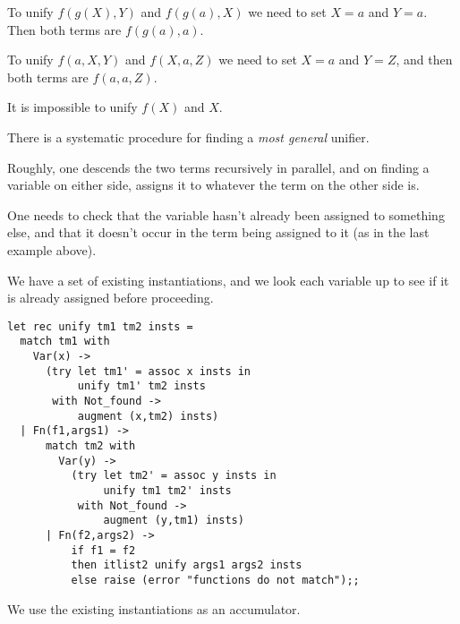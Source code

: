 \begin{slide*}


\vspace*{0.5cm}

To unify {\red $f(g(X),Y)$} and {\red $f(g(a),X)$} we need to set {\red $X =
a$} and {\red $Y = a$}. Then both terms are {\red $f(g(a),a)$}.

To unify {\red $f(a,X,Y)$} and {\red $f(X,a,Z)$} we need to set {\red $X = a$}
and {\red $Y = Z$}, and then both terms are {\red $f(a,a,Z)$}.

It is impossible to unify {\red $f(X)$} and {\red $X$}.

There is a systematic procedure for finding a {\em most general} unifier.

Roughly, one descends the two terms recursively in parallel, and on finding a
variable on either side, assigns it to whatever the term on the other side is.

One needs to check that the variable hasn't already been assigned to something
else, and that it doesn't occur in the term being assigned to it (as in the
last example above).

\end{slide*}




\begin{slide*}


We have a set of existing instantiations, and we look each variable up
to see if it is already assigned before proceeding.

\begin{black}\begin{footnotesize}\begin{verbatim}
let rec unify tm1 tm2 insts =
  match tm1 with
    Var(x) ->
      (try let tm1' = assoc x insts in
           unify tm1' tm2 insts
       with Not_found ->
           augment (x,tm2) insts)
  | Fn(f1,args1) ->
      match tm2 with
        Var(y) ->
          (try let tm2' = assoc y insts in
               unify tm1 tm2' insts
           with Not_found ->
               augment (y,tm1) insts)
      | Fn(f2,args2) ->
          if f1 = f2
          then itlist2 unify args1 args2 insts
          else raise (error "functions do not match");;
\end{verbatim}\end{footnotesize}\end{black}

We use the existing instantiations as an accumulator.

\end{slide*}



